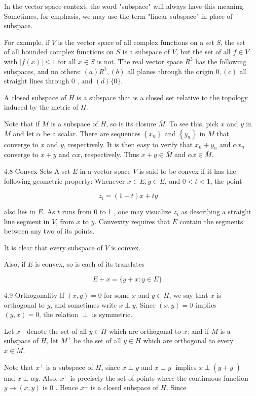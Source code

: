 \documentclass[10pt]{article}
\begin{document}
In the vector space context, the word "subspace" will always have this meaning. Sometimes, for emphasis, we may use the term "linear subspace" in place of subspace.

For example, if $V$ is the vector space of all complex functions on a set $S$, the set of all bounded complex functions on $S$ is a subspace of $V$, but the set of all $f \in V$ with $|f(x)| \leq 1$ for all $x \in S$ is not. The real vector space $R^{3}$ has the following subspaces, and no others: $(a) R^{3},(b)$ all planes through the origin $0,(c)$ all straight lines through 0 , and $(d)\{0\}$.

A closed subspace of $H$ is a subspace that is a closed set relative to the topology induced by the metric of $H$.

Note that if $M$ is a subspace of $H$, so is its closure $\bar{M}$. To see this, pick $x$ and $y$ in $\bar{M}$ and let $\alpha$ be a scalar. There are sequences $\left\{x_{n}\right\}$ and $\left\{y_{n}\right\}$ in $M$ that converge to $x$ and $y$, respectively. It is then easy to verify that $x_{n}+y_{n}$ and $\alpha x_{n}$ converge to $x+y$ and $\alpha x$, respectively. Thus $x+y \in \bar{M}$ and $\alpha x \in \bar{M}$.

4.8 Convex Sets A set $E$ in a vector space $V$ is said to be convex if it has the following geometric property: Whenever $x \in E, y \in E$, and $0<t<1$, the point

$$
z_{t}=(1-t) x+t y
$$

also lies in $E$. As $t$ runs from 0 to 1 , one may visualize $z_{t}$ as describing a straight line segment in $V$, from $x$ to $y$. Convexity requires that $E$ contain the segments between any two of its points.

It is clear that every subspace of $V$ is convex.

Also, if $E$ is convex, so is each of its translates

$$
E+x=\{y+x: y \in E\} .
$$

4.9 Orthogonality If $(x, y)=0$ for some $x$ and $y \in H$, we say that $x$ is orthogonal to $y$, and sometimes write $x \perp y$. Since $(x, y)=0$ implies $(y, x)=0$, the relation $\perp$ is symmetric.

Let $x^{\perp}$ denote the set of all $y \in H$ which are orthogonal to $x$; and if $M$ is a subspace of $H$, let $M^{\perp}$ be the set of all $y \in H$ which are orthogonal to every $x \in M$.

Note that $x^{\perp}$ is a subspace of $H$, since $x \perp y$ and $x \perp y^{\prime}$ implies $x \perp\left(y+y^{\prime}\right)$ and $x \perp \alpha y$. Also, $x^{\perp}$ is precisely the set of points where the continuous function $y \rightarrow(x, y)$ is 0 . Hence $x^{\perp}$ is a closed subspace of $H$. Since
\end{document}
